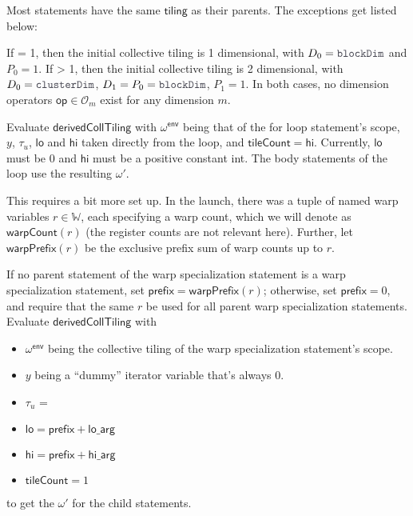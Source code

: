 \filbreak
Most statements have the same $\mathsf{tiling}$ as their parents.
The exceptions get listed below:

\filbreak
{}

If  = 1, then the initial collective tiling is 1 dimensional, with $D_0 = \lighttt{blockDim}$ and $P_0 = 1$.
If  > 1, then the initial collective tiling is 2 dimensional, with $D_0 = \lighttt{clusterDim}$, $D_1 = P_0 = \lighttt{blockDim}$, $P_1 = 1$.
In both cases, no dimension operators $\mathsf{op} \in \mathcal{O}_m$ exist for any dimension $m$.

\filbreak
{}

Evaluate $\mathsf{derivedCollTiling}$ with $\mathsf{\omega^{env}}$ being that of the for loop statement's scope, $y$, $\tau_u$, $\mathsf{lo}$ and $\mathsf{hi}$ taken directly from the loop, and $\mathsf{tileCount} = \mathsf{hi}$.
Currently, $\mathsf{lo}$ must be 0 and $\mathsf{hi}$ must be a positive constant int.
The body statements of the loop use the resulting $\omega'$.

\filbreak
{}

This requires a bit more set up.
In the  launch, there was a tuple of named warp variables $r \in \mathbb{W}$, each specifying a warp count, which we will denote as $\mathsf{warpCount}(r)$ (the register counts are not relevant here).
Further, let $\mathsf{warpPrefix}(r)$ be the exclusive prefix sum of warp counts up to $r$.

\filbreak
If no parent statement of the warp specialization statement is a warp specialization statement, set $\mathsf{prefix} = \mathsf{warpPrefix}(r)$; otherwise, set $\mathsf{prefix}=0$, and require that the same $r$ be used for all parent warp specialization statements.
Evaluate $\mathsf{derivedCollTiling}$ with
\begin{itemize}
  \item $\mathsf{\omega^{env}}$ being the collective tiling of the warp specialization statement's scope.
  \filbreak
  \item $y$ being a ``dummy'' iterator variable that's always 0.
  \filbreak
  \item $\tau_u$ = 
  \filbreak
  \item $\mathsf{lo} = \mathsf{prefix} + \mathsf{lo\_arg}$
  \filbreak
  \item $\mathsf{hi} = \mathsf{prefix} + \mathsf{hi\_arg}$
  \filbreak
  \item $\mathsf{tileCount} = 1$
\end{itemize}
to get the $\omega'$ for the child statements.

